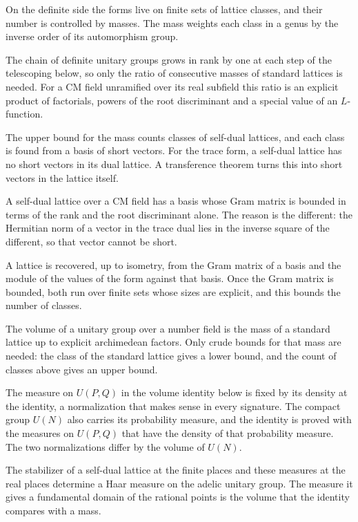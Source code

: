 On the definite side the forms live on finite sets of lattice classes, and their number is
controlled by masses. The mass weights each class in a genus by the inverse order of its
automorphism group.

The chain of definite unitary groups grows in rank by one at each step of the telescoping
below, so only the ratio of consecutive masses of standard lattices is needed. For a CM
field unramified over its real subfield this ratio is an explicit product of factorials,
powers of the root discriminant and a special value of an $L$-function.

The upper bound for the mass counts classes of self-dual lattices, and each class is found from a
basis of short vectors. For the trace form, a self-dual lattice has no short vectors in its dual
lattice. A transference theorem turns this into short vectors in the lattice itself.

A self-dual lattice over a CM field has a basis whose Gram matrix is bounded in terms of the rank
and the root discriminant alone. The reason is the different: the Hermitian norm of a vector in
the trace dual lies in the inverse square of the different, so that vector cannot be short.

A lattice is recovered, up to isometry, from the Gram matrix of a basis and the module of the
values of the form against that basis. Once the Gram matrix is bounded, both run over finite sets
whose sizes are explicit, and this bounds the number of classes.

The volume of a unitary group over a number field is the mass of a standard lattice up to
explicit archimedean factors. Only crude bounds for that mass are needed: the class of the
standard lattice gives a lower bound, and the count of classes above gives an upper bound.

The measure on $U(P,Q)$ in the volume identity below is fixed by its density at the identity, a
normalization that makes sense in every signature. The compact group $U(N)$ also carries its
probability measure, and the identity is proved with the measures on $U(P,Q)$ that have the
density of that probability measure. The two normalizations differ by the volume of $U(N)$.

The stabilizer of a self-dual lattice at the finite places and these measures at the real places
determine a Haar measure on the adelic unitary group. The measure it gives a fundamental domain of
the rational points is the volume that the identity compares with a mass.

